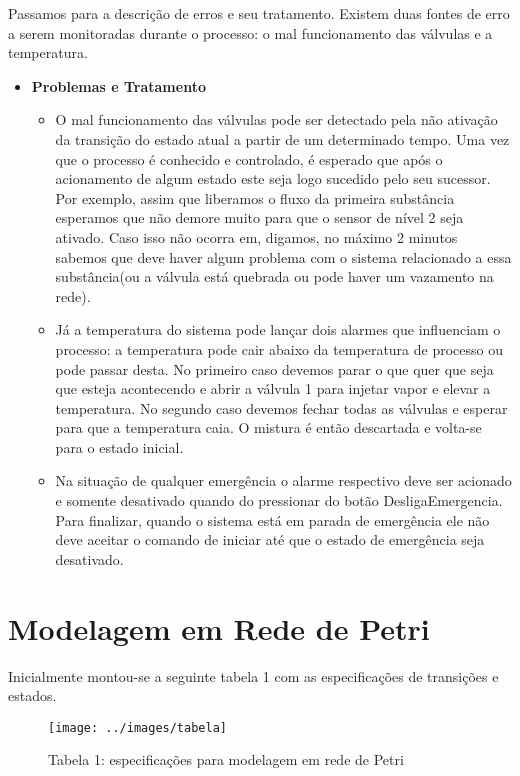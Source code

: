  Passamos para a descrição de erros e seu tratamento. Existem duas fontes de erro a serem monitoradas durante
o processo: o mal funcionamento das válvulas e a temperatura.
\begin{itemize}
\item \textbf{Problemas e Tratamento}
	\begin{itemize}
	\item  O mal funcionamento das válvulas pode ser detectado
pela não ativação da transição do estado atual a partir de um determinado tempo. Uma vez que o processo é conhecido e controlado, é esperado que após o acionamento de algum estado este seja logo sucedido pelo seu sucessor. Por exemplo, assim que liberamos o fluxo
da primeira substância esperamos que não demore muito para que o sensor de nível 2 seja ativado. Caso isso não ocorra em, digamos, no máximo 2 minutos sabemos que deve haver algum problema com o sistema relacionado a essa substância(ou a válvula está quebrada 
ou pode haver um vazamento na rede).
	\item   Já a temperatura do sistema pode lançar dois alarmes que influenciam o processo: a temperatura
pode cair abaixo da temperatura de processo ou pode passar desta. No primeiro caso devemos parar o que quer que seja que esteja acontecendo e abrir a válvula 1 para injetar vapor e elevar a temperatura. No segundo caso devemos fechar todas as válvulas e esperar
para que a temperatura caia. O mistura é então descartada e volta-se para o estado inicial.
	\item Na situação de qualquer emergência
o alarme respectivo deve ser acionado e somente desativado quando do pressionar do botão DesligaEmergencia. Para finalizar,
quando o sistema está em parada de emergência ele não deve aceitar o comando de iniciar até que o estado de emergência seja 
desativado.
	\end{itemize}
\end{itemize}


\section{Modelagem em Rede de Petri}

Inicialmente montou-se a seguinte tabela 1 com as especificações de transições e estados. 

\begin{figure*}
	\centering
	\texttt{[image: ../images/tabela]}
	\caption*{Tabela 1: especificações para modelagem em rede de Petri}
	\label{fig:planta}
\end{figure*}


